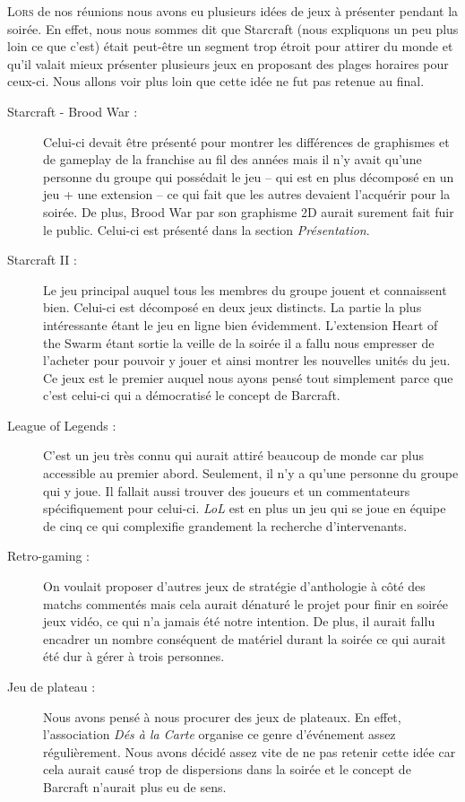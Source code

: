 \lettrine{L}{ors} de nos réunions nous avons eu plusieurs idées de jeux
à présenter pendant la soirée. En effet, nous nous sommes dit que
Starcraft (nous expliquons un peu plus loin ce que c'est) était
peut-être un segment trop étroit pour attirer du monde et qu'il valait
mieux présenter plusieurs jeux en proposant des plages horaires pour
ceux-ci. Nous allons voir plus loin que cette idée ne fut pas retenue au
final.

\begin{description}

\item[Starcraft - Brood War :] Celui-ci devait être présenté pour
montrer les différences de graphismes et de gameplay de la franchise au
fil des années mais il n'y avait qu'une personne du groupe qui possédait
le jeu -- qui est en plus décomposé en un jeu + une extension -- ce qui
fait que les autres devaient l'acquérir pour la soirée. De plus, \og
Brood War \fg{} par son graphisme 2D aurait surement fait fuir le public. 
Celui-ci est présenté dans la section
\emph{Présentation}.

\item[Starcraft II :] Le jeu principal auquel tous les membres du groupe
jouent et connaissent bien. Celui-ci est décomposé en deux jeux distincts.
La partie la plus intéressante étant le jeu en ligne bien évidemment.
L'extension \og Heart of the Swarm \fg{} étant sortie la veille de la
soirée il a fallu nous empresser de l'acheter pour pouvoir y jouer et
ainsi montrer les nouvelles unités du jeu. Ce jeux est le premier auquel
nous ayons pensé tout simplement parce que c'est celui-ci qui a
démocratisé le concept de Barcraft.

\item[League of Legends :] C'est un jeu très connu qui aurait attiré
beaucoup de monde car plus accessible au premier abord. Seulement, il
n'y a qu'une personne du groupe qui y joue. Il fallait aussi trouver des
joueurs et un commentateurs spécifiquement pour celui-ci. \emph{LoL} est en plus
un jeu qui se joue en équipe de cinq ce qui complexifie grandement la
recherche d'intervenants.

\item[Retro-gaming :] On voulait proposer d'autres jeux de stratégie
d'anthologie à côté des matchs commentés mais cela aurait dénaturé le
projet pour finir en soirée jeux vidéo, ce qui n'a jamais été notre
intention. De plus, il aurait fallu encadrer un nombre conséquent de
matériel durant la soirée ce qui aurait été dur à gérer à trois
personnes.

\item[Jeu de plateau :] Nous avons pensé à nous procurer des jeux de
plateaux. En effet, l'association \emph{Dés à la Carte} organise ce
genre d'événement assez régulièrement. Nous avons décidé assez vite de
ne pas retenir cette idée car cela aurait causé trop de dispersions dans
la soirée et le concept de Barcraft n'aurait plus eu de sens.

\end{description}

